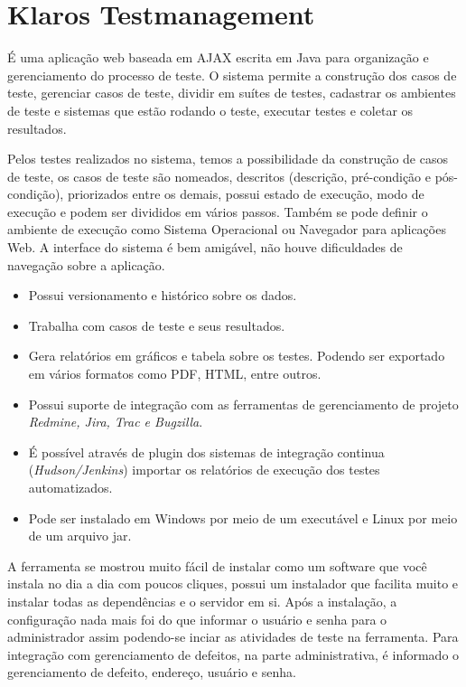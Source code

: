 \documentclass{abnt}
\begin{document}
		\section{Klaros Testmanagement}
		
			É uma aplicação web baseada em AJAX escrita em Java para organização e gerenciamento do processo de teste. O sistema
			permite a construção dos casos de teste, gerenciar casos de teste, dividir em suítes de testes, cadastrar os
			ambientes de teste e sistemas que estão rodando o teste, executar testes e coletar os resultados.
			
			Pelos testes realizados no sistema, temos a possibilidade da construção de casos de teste, os casos de teste são
			nomeados, descritos (descrição, pré-condição e pós-condição), priorizados entre os demais, possui estado de
			execução, modo de execução e podem ser divididos em vários passos. Também se pode definir o ambiente de execução
			como Sistema Operacional ou Navegador para aplicações Web. A interface do sistema é bem amigável, não houve
			dificuldades de navegação sobre a aplicação.
			
			\begin{itemize}
			  \item Possui versionamento e histórico sobre os dados.
			  \item Trabalha com casos de teste e seus resultados.
			  \item Gera relatórios em gráficos e tabela sobre os testes. Podendo ser exportado em vários formatos como PDF,
			  HTML, entre outros.
			  \item Possui suporte de integração com as ferramentas de gerenciamento de projeto \emph{Redmine, Jira, Trac e Bugzilla}.
			  \item É possível através de plugin dos sistemas de integração continua (\emph{Hudson/Jenkins}) importar os relatórios de
			  execução dos testes automatizados.
			  \item Pode ser instalado em Windows por meio de um executável e Linux por meio de um arquivo jar.
			\end{itemize}
			
			A ferramenta se mostrou muito fácil de instalar como um software que você instala no dia a dia com poucos cliques,
			possui um instalador que facilita muito e instalar todas as dependências e o servidor em si. Após a instalação, a
			configuração nada mais foi do que informar o usuário e senha para o administrador assim podendo-se inciar as
			atividades de teste na ferramenta. Para integração com gerenciamento de defeitos, na parte administrativa, é
			informado o gerenciamento de defeito, endereço, usuário e senha. 
			
\end{document}
